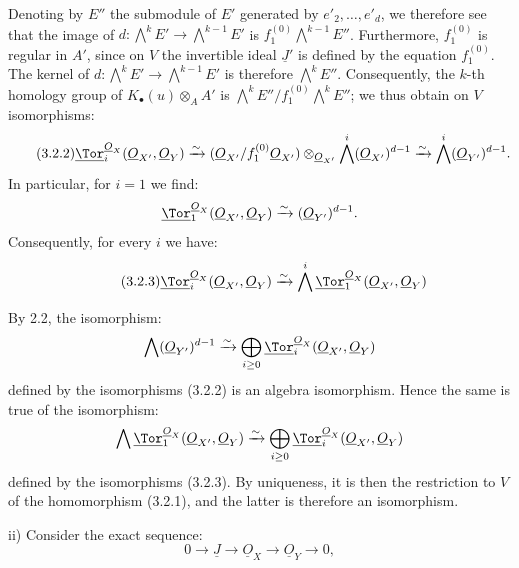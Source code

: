 %
Denoting by \(E''\) the submodule of \(E'\) generated by \(e'_2,\ldots,e'_d\), we therefore see that the image of \(d:\bigwedge^kE'\longrightarrow\bigwedge^{k-1}E'\) is \(f_1^{(0)}\bigwedge^{k-1}E''\). Furthermore, \(f_1^{(0)}\) is regular in \(A'\), since on \(V\) the invertible ideal \(\underline{J}'\) is defined by the equation \(f_1^{(0)}\). The kernel of \(d:\bigwedge^kE'\longrightarrow\bigwedge^{k-1}E'\) is therefore \(\bigwedge^kE''\). Consequently, the \(k\)-th homology group of \(K_\bullet(u)\otimes_AA'\) is \(\bigwedge^kE''/f_1^{(0)}\bigwedge^kE''\); we thus obtain on \(V\) isomorphisms:
\begin{equation}\tag{3.2.2}
\underline{\Tor}_i^{\underline{O}_X}(\underline{O}_{X'},\underline{O}_Y)
\xrightarrow{\sim}
(\underline{O}_{X'}/f_1^{(0)}\underline{O}_{X'})\otimes_{\underline{O}_{X'}}
\bigwedge^i(\underline{O}_{X'})^{d-1}
\xrightarrow{\sim}
\bigwedge^i(\underline{O}_{Y'})^{d-1}.
\end{equation}
In particular, for \(i=1\) we find:
\[
\underline{\Tor}_1^{\underline{O}_X}(\underline{O}_{X'},\underline{O}_Y)
\xrightarrow{\sim}
(\underline{O}_{Y'})^{d-1}.
\]
Consequently, for every \(i\) we have:
\begin{equation}\tag{3.2.3}
\underline{\Tor}_i^{\underline{O}_X}(\underline{O}_{X'},\underline{O}_Y)
\xrightarrow{\sim}
\bigwedge^i\underline{\Tor}_1^{\underline{O}_X}(\underline{O}_{X'},\underline{O}_Y)
\end{equation}

By 2.2, the isomorphism:
\[
\bigwedge(\underline{O}_{Y'})^{d-1}
\xrightarrow{\sim}
\bigoplus_{i\ge0}\underline{\Tor}_i^{\underline{O}_X}(\underline{O}_{X'},\underline{O}_Y)
\]
defined by the isomorphisms (3.2.2) is an algebra isomorphism. Hence the same is true of the isomorphism:
\[
\bigwedge\underline{\Tor}_1^{\underline{O}_X}(\underline{O}_{X'},\underline{O}_Y)
\xrightarrow{\sim}
\bigoplus_{i\ge0}\underline{\Tor}_i^{\underline{O}_X}(\underline{O}_{X'},\underline{O}_Y)
\]
defined by the isomorphisms (3.2.3). By uniqueness, it is then the restriction to \(V\) of the homomorphism (3.2.1), and the latter is therefore an isomorphism.

ii) Consider the exact sequence:
\[
0\longrightarrow \underline{J}\longrightarrow\underline{O}_X\longrightarrow\underline{O}_Y\longrightarrow0,
\]

